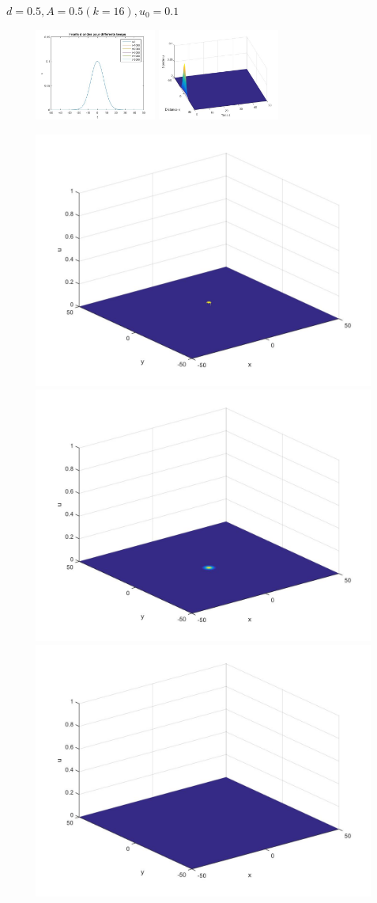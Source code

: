 \documentclass[10pt]{beamer}
\begin{document}
\begin{frame}{$\ d=0.5, A=0.5 (k=16), u_0=0.1$}{}
\begin{figure}[H]
	\centering
	\includegraphics[width=0.40\linewidth, height=3cm]{Allee/F2331}\hfill
	\includegraphics[width=0.55\linewidth, height=3cm]{Allee/F4331}
\end{figure}
\begin{figure}[H]
	\centering
	\includegraphics[width=0.3\linewidth]{Allee/331__1_}\hfill
    \includegraphics[width=0.3\linewidth]{Allee/331__2_}\hfill
	\includegraphics[width=0.3\linewidth]{Allee/331__3_}
\end{figure}
\end{frame}
\end{document}
